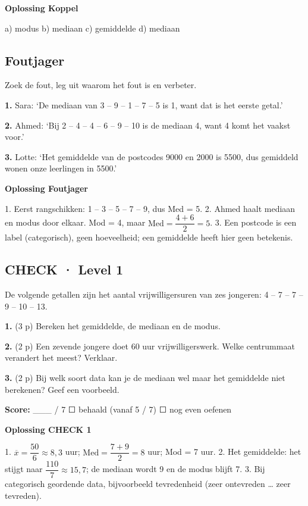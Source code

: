 \begin{oplossing}
\textbf{Oplossing Koppel}

a) modus \quad b) mediaan \quad c) gemiddelde \quad d) mediaan
\end{oplossing}

\subsection*{Foutjager}

Zoek de fout, leg uit waarom het fout is en verbeter.

\textbf{1.} Sara: ‘De mediaan van 3 – 9 – 1 – 7 – 5 is 1, want dat is het eerste getal.’ \lijn

\textbf{2.} Ahmed: ‘Bij 2 – 4 – 4 – 6 – 9 – 10 is de mediaan 4, want 4 komt het vaakst voor.’ \lijn

\textbf{3.} Lotte: ‘Het gemiddelde van de postcodes 9000 en 2000 is 5500, dus gemiddeld wonen onze leerlingen in 5500.’ \lijn

\begin{oplossing}
\textbf{Oplossing Foutjager}

1. Eerst rangschikken: 1 – 3 – 5 – 7 – 9, dus Med = 5. 2. Ahmed haalt mediaan en modus door elkaar. Mod = 4, maar $\text{Med}=\dfrac{4+6}{2}=5$. 3. Een postcode is een label (categorisch), geen hoeveelheid; een gemiddelde heeft hier geen betekenis.
\end{oplossing}

\subsection*{CHECK · Level 1}

De volgende getallen zijn het aantal vrijwilligersuren van zes jongeren: 4 – 7 – 7 – 9 – 10 – 13.

\textbf{1.} (3 p) Bereken het gemiddelde, de mediaan en de modus. \lijn

\textbf{2.} (2 p) Een zevende jongere doet 60 uur vrijwilligerswerk. Welke centrummaat verandert het meest? Verklaar. \lijn

\textbf{3.} (2 p) Bij welk soort data kan je de mediaan wel maar het gemiddelde niet berekenen? Geef een voorbeeld. \lijn

\begin{doel}
\textbf{Score:} \_\_\_ / 7 \quad ☐ behaald (vanaf 5 / 7) \quad ☐ nog even oefenen
\end{doel}

\begin{oplossing}
\textbf{Oplossing CHECK 1}

1. $\overline{x}=\dfrac{50}{6}\approx 8{,}3$ uur; $\text{Med}=\dfrac{7+9}{2}=8$ uur; Mod = 7 uur. 2. Het gemiddelde: het stijgt naar $\dfrac{110}{7}\approx 15{,}7$; de mediaan wordt 9 en de modus blijft 7. 3. Bij categorisch geordende data, bijvoorbeeld tevredenheid (zeer ontevreden … zeer tevreden).
\end{oplossing}
